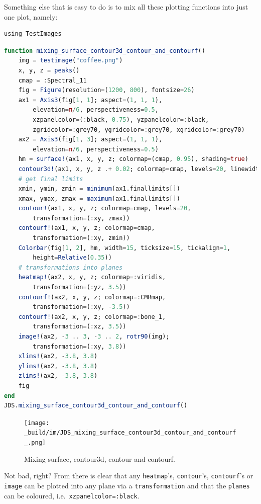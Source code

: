 \documentclass[
  notoc %
]{tufte-book}
\newcommand{\passthrough}[1]{#1}
\begin{document}
Something else that is easy to do is to mix all these plotting functions
into just one plot, namely:

\begin{lstlisting}
using TestImages
\end{lstlisting}

\begin{lstlisting}[language=Julia]
function mixing_surface_contour3d_contour_and_contourf()
    img = testimage("coffee.png")
    x, y, z = peaks()
    cmap = :Spectral_11
    fig = Figure(resolution=(1200, 800), fontsize=26)
    ax1 = Axis3(fig[1, 1]; aspect=(1, 1, 1),
        elevation=π/6, perspectiveness=0.5,
        xzpanelcolor=(:black, 0.75), yzpanelcolor=:black,
        zgridcolor=:grey70, ygridcolor=:grey70, xgridcolor=:grey70)
    ax2 = Axis3(fig[1, 3]; aspect=(1, 1, 1),
        elevation=π/6, perspectiveness=0.5)
    hm = surface!(ax1, x, y, z; colormap=(cmap, 0.95), shading=true)
    contour3d!(ax1, x, y, z .+ 0.02; colormap=cmap, levels=20, linewidth=2)
    # get final limits
    xmin, ymin, zmin = minimum(ax1.finallimits[])
    xmax, ymax, zmax = maximum(ax1.finallimits[])
    contour!(ax1, x, y, z; colormap=cmap, levels=20,
        transformation=(:xy, zmax))
    contourf!(ax1, x, y, z; colormap=cmap,
        transformation=(:xy, zmin))
    Colorbar(fig[1, 2], hm, width=15, ticksize=15, tickalign=1,
        height=Relative(0.35))
    # transformations into planes
    heatmap!(ax2, x, y, z; colormap=:viridis,
        transformation=(:yz, 3.5))
    contourf!(ax2, x, y, z; colormap=:CMRmap,
        transformation=(:xy, -3.5))
    contourf!(ax2, x, y, z; colormap=:bone_1,
        transformation=(:xz, 3.5))
    image!(ax2, -3 .. 3, -3 .. 2, rotr90(img);
        transformation=(:xy, 3.8))
    xlims!(ax2, -3.8, 3.8)
    ylims!(ax2, -3.8, 3.8)
    zlims!(ax2, -3.8, 3.8)
    fig
end
JDS.mixing_surface_contour3d_contour_and_contourf()
\end{lstlisting}

\begin{figure}
\hypertarget{fig:mixing_surface_contour3d_contour_and_contourf}{%
\centering
\texttt{[image: \_build/im/JDS\_mixing\_surface\_contour3d\_contour\_and\_contourf\_.png]}
\caption{Mixing surface, contour3d, contour and
contourf.}\label{fig:mixing_surface_contour3d_contour_and_contourf}
}
\end{figure}

Not bad, right? From there is clear that any
\passthrough{\lstinline!heatmap!}'s,
\passthrough{\lstinline!contour!}'s,
\passthrough{\lstinline!contourf!}'s or \passthrough{\lstinline!image!}
can be plotted into any plane via a
\passthrough{\lstinline!transformation!} and that the
\passthrough{\lstinline!planes!} can be coloured,
i.e.~\passthrough{\lstinline!xzpanelcolor=:black!}.
\end{document}

